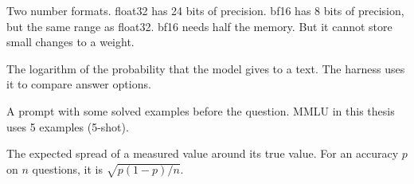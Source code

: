 \begin{description}[leftmargin=0.6cm,style=nextline]
\item[bf16 and float32] Two number formats. float32 has 24 bits of precision. bf16 has 8 bits of precision, but the same range as float32. bf16 needs half the memory. But it cannot store small changes to a weight.
\item[Log-likelihood] The logarithm of the probability that the model gives to a text. The harness uses it to compare answer options.
\item[Few-shot] A prompt with some solved examples before the question. MMLU in this thesis uses 5 examples (5-shot).
\item[Standard error] The expected spread of a measured value around its true value. For an accuracy $p$ on $n$ questions, it is $\sqrt{p(1-p)/n}$.
\end{description}
